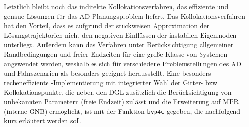 Letztlich bleibt noch das indirekte Kollokationsverfahren, das effiziente und genaue Lösungen für das \gls{AD}-Planungsproblem liefert. Das Kollokationsverfahren hat den Vorteil, dass es aufgrund der stückweisen Approximation der Lösungstrajektorien nicht den negativen Einflüssen der instabilen Eigenmoden unterliegt. Außerdem kann das Verfahren unter Berücksichtigung allgemeiner Randbedingungen und freier Endzeiten für eine große Klasse von Systemen angewendet werden, weshalb es sich für verschiedene Problemstellungen des \gls{AD} und Fahrszenarien als besonders geeignet herausstellt. Eine besonders recheneffiziente \Matlab-Implementierung mit integrierter Wahl der Gitter- bzw. Kollokationspunkte, die neben den \gls{DGL} zusätzlich die Berücksichtigung von unbekannten Parametern (freie Endzeit) zulässt und die Erweiterung auf \gls{MPR} (interne \gls{GNB}) ermöglicht, ist mit der Funktion \texttt{bvp4c} gegeben, die nachfolgend kurz erläutert werden soll.

